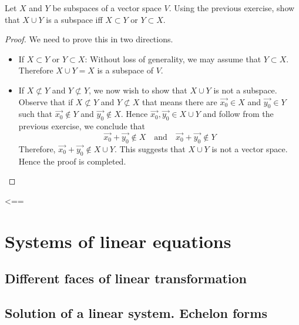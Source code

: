 \begin{exercise}
  Let $X$ and $Y$ be subspaces of a vector space $V$. Using the previous
  exercise, show that $X\cup Y$ is a subspace iff $X\subset Y$ or 
  $Y\subset X$.
\end{exercise}
\begin{proof}
  We need to prove this in two directions.
  \begin{itemize}
    \item If $X\subset Y$ or $Y\subset X$: Without loss of generality, 
      we may assume that $Y\subset X$. Therefore $X\cup Y=X$ is a 
      subspace of $V$.
    \item If $X\not\subset Y$ and $Y\not\subset Y$, we now wish to show that
      $X\cup Y$ is not a subspace. Observe that if
      $X\not\subset Y$ and $Y\not\subset X$ that means there are 
      $\vec{x_0}\in X$ and $\vec{y_0}\in Y$ such that $\vec{x_0}\notin Y$
      and $\vec{y_0}\notin X$. Hence $\vec{x_0},\vec{y_0}\in X\cup Y$ and
      follow from the previous exercise, we conclude that
      \[
        \vec{x_0}+\vec{y_0}\notin X
        \quad\text{and}\quad
        \vec{x_0}+\vec{y_0}\notin Y
      \]
      Therefore, $\vec{x_0}+\vec{y_0}\notin X\cup Y$. This suggests that
      $X\cup Y$ is not a vector space. Hence the proof is completed.
  \end{itemize}
\end{proof}
<==
\chapter{Systems of linear equations}

\section{Different faces of linear transformation}
\section{Solution of a linear system. Echelon forms}

